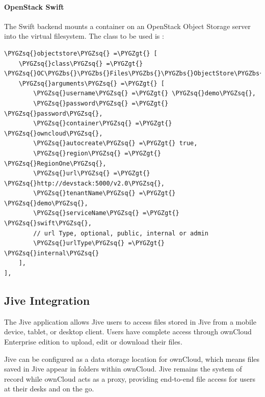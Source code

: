 \documentclass[letterpaper,10pt,english]{sphinxmanual}
\def\PYGZbs{\char`\\}
\def\PYGZgt{\char`\>}
\def\PYGZsq{\char`\'}
\renewcommand\PYGZsq{\textquotesingle}
\begin{document}
\paragraph{OpenStack Swift}
\label{enterprise_external_storage/s3_swift_as_primary_object_store_configuration:openstack-swift}
The Swift backend mounts a container on an OpenStack Object Storage server
into the virtual filesystem. The class to be used is :

\begin{Verbatim}[commandchars=\\\{\}]
\PYGZsq{}objectstore\PYGZsq{} =\PYGZgt{} [
    \PYGZsq{}class\PYGZsq{} =\PYGZgt{} \PYGZsq{}OC\PYGZbs{}\PYGZbs{}Files\PYGZbs{}\PYGZbs{}ObjectStore\PYGZbs{}\PYGZbs{}Swift\PYGZsq{},
    \PYGZsq{}arguments\PYGZsq{} =\PYGZgt{} [
        \PYGZsq{}username\PYGZsq{} =\PYGZgt{} \PYGZsq{}demo\PYGZsq{},
        \PYGZsq{}password\PYGZsq{} =\PYGZgt{} \PYGZsq{}password\PYGZsq{},
        \PYGZsq{}container\PYGZsq{} =\PYGZgt{} \PYGZsq{}owncloud\PYGZsq{},
        \PYGZsq{}autocreate\PYGZsq{} =\PYGZgt{} true,
        \PYGZsq{}region\PYGZsq{} =\PYGZgt{} \PYGZsq{}RegionOne\PYGZsq{},
        \PYGZsq{}url\PYGZsq{} =\PYGZgt{} \PYGZsq{}http://devstack:5000/v2.0\PYGZsq{},
        \PYGZsq{}tenantName\PYGZsq{} =\PYGZgt{} \PYGZsq{}demo\PYGZsq{},
        \PYGZsq{}serviceName\PYGZsq{} =\PYGZgt{} \PYGZsq{}swift\PYGZsq{},
        // url Type, optional, public, internal or admin
        \PYGZsq{}urlType\PYGZsq{} =\PYGZgt{} \PYGZsq{}internal\PYGZsq{}
    ],
],
\end{Verbatim}


\subsection{Jive Integration}
\label{enterprise_external_storage/jive_configuration:jive-integration}\label{enterprise_external_storage/jive_configuration::doc}
The Jive application allows Jive users to access files stored in Jive
from a mobile device, tablet, or desktop client. Users have complete access
through ownCloud Enterprise edition to upload, edit or download their files.

Jive can be configured as a data storage location for ownCloud, which means
files saved in Jive appear in folders within ownCloud. Jive remains the system
of record while ownCloud acts as a proxy, providing end-to-end file access for
users at their desks and on the go.
\end{document}
